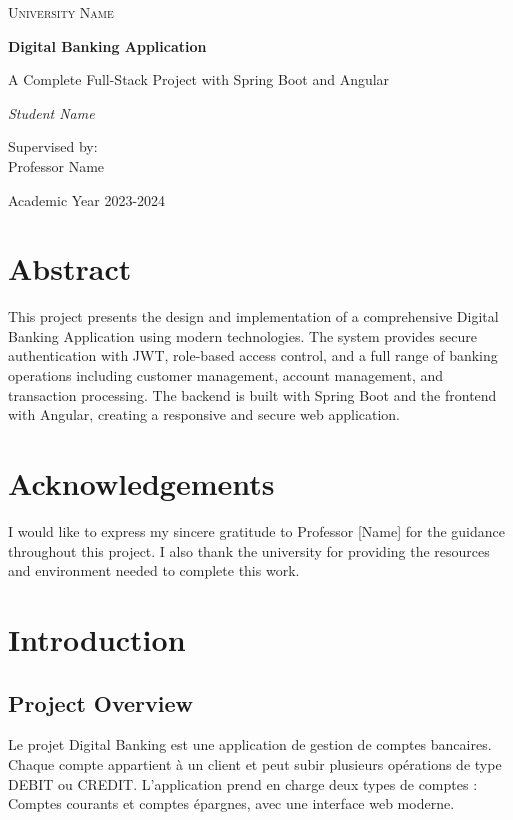 \documentclass[12pt,a4paper]{report}
\newcounter{screenshotcounter}[chapter]
\begin{document}
\begin{titlepage}
    \centering
    \vspace*{1cm}
    {\scshape\LARGE University Name \par}
    \vspace{1.5cm}
    {\huge\bfseries Digital Banking Application\par}
    \vspace{2cm}
    {\Large A Complete Full-Stack Project with Spring Boot and Angular\par}
    \vspace{2cm}
    {\Large\itshape Student Name\par}
    \vfill
    Supervised by:\\
    Professor Name
    \vfill
    {\large Academic Year 2023-2024\par}
\end{titlepage}

\tableofcontents
\listoffigures
\listoftables

\chapter*{Abstract}
This project presents the design and implementation of a comprehensive Digital Banking Application using modern technologies. The system provides secure authentication with JWT, role-based access control, and a full range of banking operations including customer management, account management, and transaction processing. The backend is built with Spring Boot and the frontend with Angular, creating a responsive and secure web application.

\chapter*{Acknowledgements}
I would like to express my sincere gratitude to Professor [Name] for the guidance throughout this project. I also thank the university for providing the resources and environment needed to complete this work.

\chapter{Introduction}

\section{Project Overview}
Le projet Digital Banking est une application de gestion de comptes bancaires. Chaque compte appartient à un client et peut subir plusieurs opérations de type DEBIT ou CREDIT. L'application prend en charge deux types de comptes : Comptes courants et comptes épargnes, avec une interface web moderne.
\end{document}
